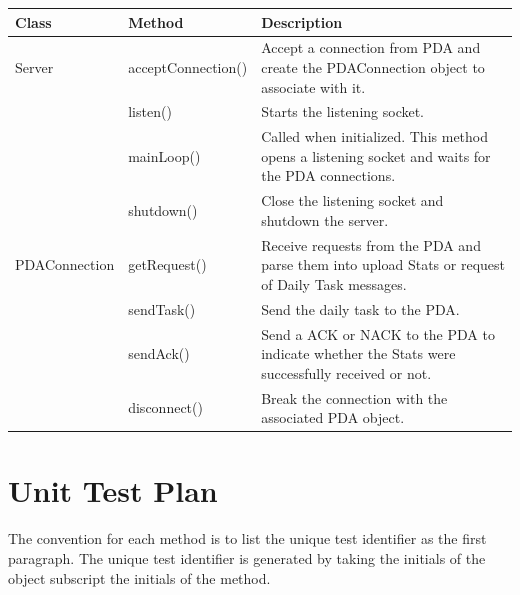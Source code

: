 \documentclass{article}
\begin{document}
\begin{longtable}[t]{|p{1.5in}|p{2in}|p{2.5in}|}

\hline
\textbf{Class} & \textbf{Method} & \textbf{Description} \\
\hline %

Server

	& acceptConnection() & Accept a connection from PDA and create the PDAConnection object to associate with it. \\
	\cline{2-3}

  & listen() & Starts the listening socket. \\
	\cline{2-3}

	& mainLoop() & Called when initialized. This method opens a listening socket and waits for the PDA connections. \\

	\cline{2-3}

	& shutdown() & Close the listening socket and shutdown the server. \\
	
\hline %

PDAConnection
      & getRequest() & Receive requests from the PDA and parse them into upload Stats or request of Daily Task messages. \\
\cline{2-3}
      & sendTask() & Send the daily task to the PDA. \\
\cline{2-3}
      & sendAck() & Send a ACK or NACK to the PDA to indicate whether the Stats were successfully received or not. \\
      \cline{2-3}
      & disconnect() & Break the connection with the associated PDA object. \\
\hline

\end{longtable}

\section{Unit Test Plan}

The convention for each method is to list the unique test identifier as the first paragraph. The unique test identifier is generated by taking the initials of the object subscript the initials of the method.
\end{document}
